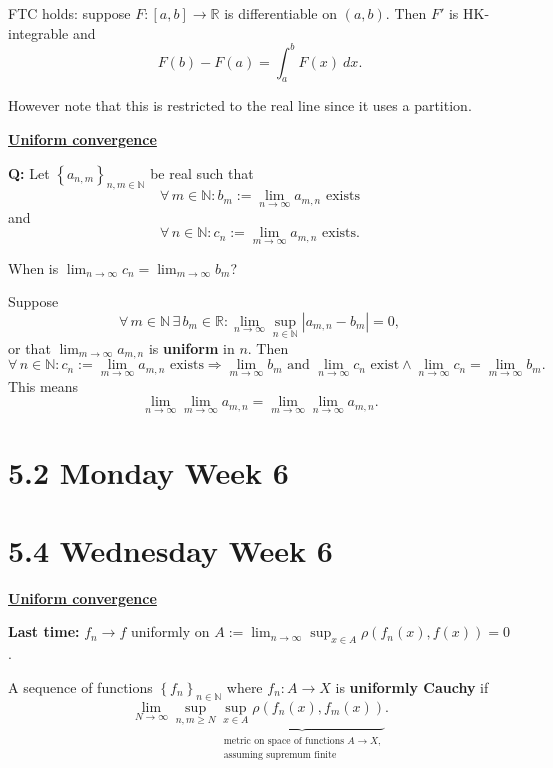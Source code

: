 \documentclass{notes}
\begin{document}
  FTC holds: suppose $F \colon [a, b] \to \mathbb R$ is differentiable on $(a, b)$.
  Then $F'$ is HK-integrable and 
  \[
    F(b) - F(a) = \int_a^b F(x)\ dx.
  \]
  
  However note that this is restricted to the real line since it uses a partition.
  
  {\boldmath \bfseries \underline{Uniform convergence}}

  {\boldmath \bfseries Q:} Let $\left \{ a_{n, m} \right \}_{n, m \in \mathbb N}$ be real such that 
  \[
    \forall \, m \in \mathbb N: b_m := \lim_{n \to \infty} a_{m, n} \text{ exists}
  \]
  and 
  \[
    \forall \, n \in \mathbb N: c_n := \lim_{m \to \infty} a_{m, n} \text{ exists.}
  \]
  
  When is $\lim_{n \to \infty} c_n = \lim_{m \to \infty} b_m$?
  
  \newpage
  
  \begin{lem}
    Suppose 
    \[
      \forall \, m \in \mathbb N\, \exists \, b_m \in \mathbb R: \lim_{n \to \infty} \sup_{n \in \mathbb N} \left | a_{m, n} - b_m \right | = 0, 
    \]
    or that $\lim_{m \to \infty} a_{m, n}$ is {\boldmath \bfseries uniform} in $n$.
    Then 
    \[
      \forall \, n \in \mathbb N: c_n := \lim_{m \to \infty} a_{m, n} \text{ exists} \Rightarrow \lim_{m \to \infty} b_m \text{ and } \lim_{n \to \infty} c_n \text{ exist} \land \lim_{n \to \infty} c_n = \lim_{m \to \infty} b_m.
    \]
    This means 
    \[
      \lim_{n \to \infty} \lim_{m \to \infty} a_{m, n} = \lim_{m \to \infty} \lim_{n \to \infty} a_{m, n}.
    \]
  \end{lem}
  
  \section{5.2 Monday Week 6}
  
  \section{5.4 Wednesday Week 6}
  
  {\boldmath \bfseries \underline{Uniform convergence}}
  
  {\boldmath \bfseries Last time:} $f_n \to f$ uniformly on $A := \lim_{n \to \infty} \sup_{x \in A} \rho(f_n(x), f(x)) = 0$.
  
  \begin{defn}
    A sequence of functions $\left \{ f_n \right \}_{n \in \mathbb N}$ where $f_n \colon A \to X$ is {\boldmath \bfseries uniformly Cauchy} if 
    \[
      \lim_{N \to \infty} \sup_{n, m \geq N} \underbrace{\sup_{x \in A} \rho(f_n(x), f_m(x))}_{\substack{\text{metric on space of functions $A \to X$,} \\ \text{assuming supremum finite}}}.
    \]
  \end{defn}
  
\end{document}
